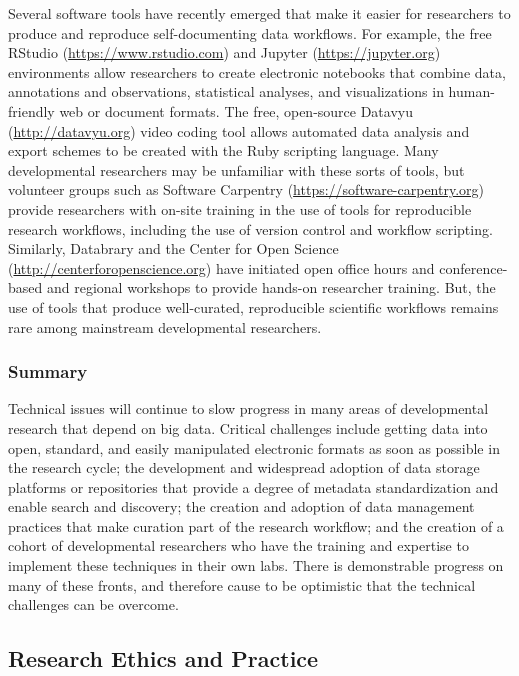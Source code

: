 \documentclass[letterpaper,man,apacite,natbib]{apa6}
\begin{document}
Several software tools have recently emerged that make it easier for researchers to produce and reproduce self-documenting data workflows.
For example, the free RStudio (\url{https://www.rstudio.com}) and Jupyter (\url{https://jupyter.org}) environments allow researchers to create electronic notebooks that combine data, annotations and observations, statistical analyses, and visualizations in human-friendly web or document formats.
The free, open-source Datavyu (\url{http://datavyu.org}) video coding tool allows automated data analysis and export schemes to be created with the Ruby scripting language.
Many developmental researchers may be unfamiliar with these sorts of tools, but volunteer groups such as Software Carpentry (\url{https://software-carpentry.org}) provide researchers with on-site training in the use of tools for reproducible research workflows, including the use of version control and workflow scripting.
Similarly, Databrary and the Center for Open Science (\url{http://centerforopenscience.org}) have initiated open office hours and conference-based and regional workshops to provide hands-on researcher training.
But, the use of tools that produce well-curated, reproducible scientific workflows remains rare among mainstream developmental researchers.

\subsubsection{Summary}

Technical issues will continue to slow progress in many areas of developmental research that depend on big data.
Critical challenges include getting data into open, standard, and easily manipulated electronic formats as soon as possible in the research cycle; the development and widespread adoption of data storage platforms or repositories that provide a degree of metadata standardization and enable search and discovery; the creation and adoption of data management practices that make curation part of the research workflow; and the creation of a cohort of developmental researchers who have the training and expertise to implement these techniques in their own labs.
There is demonstrable progress on many of these fronts, and therefore cause to be optimistic that the technical challenges can be overcome.

\subsection{Research Ethics and Practice}
\end{document}
